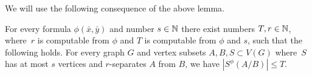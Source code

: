 We will use the following consequence of the above lemma.
%
\begin{corollary}[$\star$]\label{cor:bound}
For every formula $\phi(\bar x,\bar y)$ 
and number $s\in \mathbb{N}$
there exist numbers $T,r\in \mathbb{N}$,
where~$r$ is computable from $\phi$ and $T$ is computable from $\phi$ and $s$,
  such that the following holds. For every graph $G$ and vertex subsets $A,B,S\subset V(G)$ 
  where~$S$ has at most $s$ vertices and $r$-separates $A$ from $B$, we have $|S^\phi(A/B)|\le T$.
\end{corollary}
%
%
%
%
